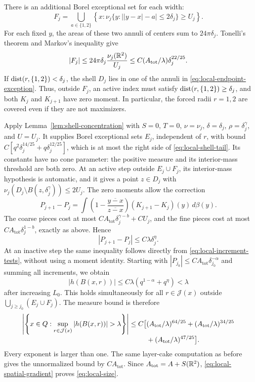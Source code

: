 There is an additional Borel exceptional set for each width:
\begin{equation}\label{eq:local-endpoint-exception}
F_j=\bigcup_{a\in\{1,2\}}
 \left\{x:\nu_j\{y:\bigl||y-x|-a\bigr|\le2\delta_j\}
                         \ge U_j\right\}.
\end{equation}
For each fixed $y$, the areas of these two annuli of centers sum to
$24\pi\delta_j$. Tonelli's theorem and Markov's inequality give
\begin{equation}\label{eq:local-endpoint-area}
|F_j|\le24\pi\delta_j\frac{\nu_j(\mathbb R^2)}{U_j}
 \le C(A_{\mathrm{tot}}/\lambda)\delta_j^{22/25}.
\end{equation}
If $\operatorname{dist}(r,\{1,2\})<\delta_j$, the shell $D_j$ lies in one of
the annuli in \eqref{eq:local-endpoint-exception}. Thus, outside
$F_j$, an active index must satisfy
$\operatorname{dist}(r,\{1,2\})\ge\delta_j$, and both $K_j$ and $K_{j+1}$
have zero moment. In particular, the forced radii $r=1,2$ are
covered even if they are not maximizers.

Apply Lemma~\ref{lem:shell-concentration} with $S=0$, $T=0$,
$\nu=\nu_j$, $\delta=\delta_j$, $\rho=\delta_j^\gamma$, and $U=U_j$.
It supplies Borel exceptional sets $E_j$, independent of $r$, with bound
$C[q^2\delta_j^{14/25}+q\delta_j^{12/25}]$, which is at most the
right side of \eqref{eq:local-shell-tail}. Its constants have no cone
parameter: the positive measure and its interior-mass threshold are
both zero.
At an active step
outside $E_j\cup F_j$, its interior-mass hypothesis is automatic,
and it gives a point $z\in D_j$ with
$\nu_j(D_j\setminus B(z,\delta_j^\gamma))\le2U_j$.
The zero moments allow the correction
\[
P_{j+1}-P_j=\int
 \left(1-\frac{\overline{y-x}}{\overline{z-x}}\right)
 (K_{j+1}-K_j)(y)\,d\beta(y).
\]
The coarse pieces cost at most
$C A_{\mathrm{tot}}\delta_j^{\gamma-b}+CU_j$, and the fine pieces cost at most
$C A_{\mathrm{tot}}\delta_j^{1-b}$, exactly as above. Hence
\[
|P_{j+1}-P_j|\le C\lambda\delta_j^\eta.
\]
At an inactive step the same inequality follows directly from
\eqref{eq:local-increment-tests}, without using a moment identity.
Starting with $|P_{j_0}|\le CA_{\mathrm{tot}}\delta_{j_0}^{-\alpha}$ and summing
all increments, we obtain
\[
|h(B(x,r))|\le C\lambda(q^{1-\alpha}+q^\eta)<\lambda
\]
after increasing $L_0$. This holds simultaneously for all
$r\in\mathcal J(x)$ outside $\bigcup_{j\ge j_0}(E_j\cup F_j)$.
The measure bound is therefore
\begin{align}
\left|\left\{x\in Q:
       \sup_{r\in\mathcal J(x)}|h(B(x,r))|>\lambda\right\}\right|
 \le C\bigl[&(A_{\mathrm{tot}}/\lambda)^{64/25}
              +(A_{\mathrm{tot}}/\lambda)^{34/25}
 \notag\\[-1mm]
              &+(A_{\mathrm{tot}}/\lambda)^{47/25}\bigr].
\label{eq:local-size-tail}
\end{align}
Every exponent is larger than one. The same layer-cake computation
as before gives the unnormalized bound by $CA_{\mathrm{tot}}$. Since
$A_{\mathrm{tot}}=A+S(\mathbb R^2)$,
\eqref{eq:local-spatial-gradient} proves \eqref{eq:local-size}.

